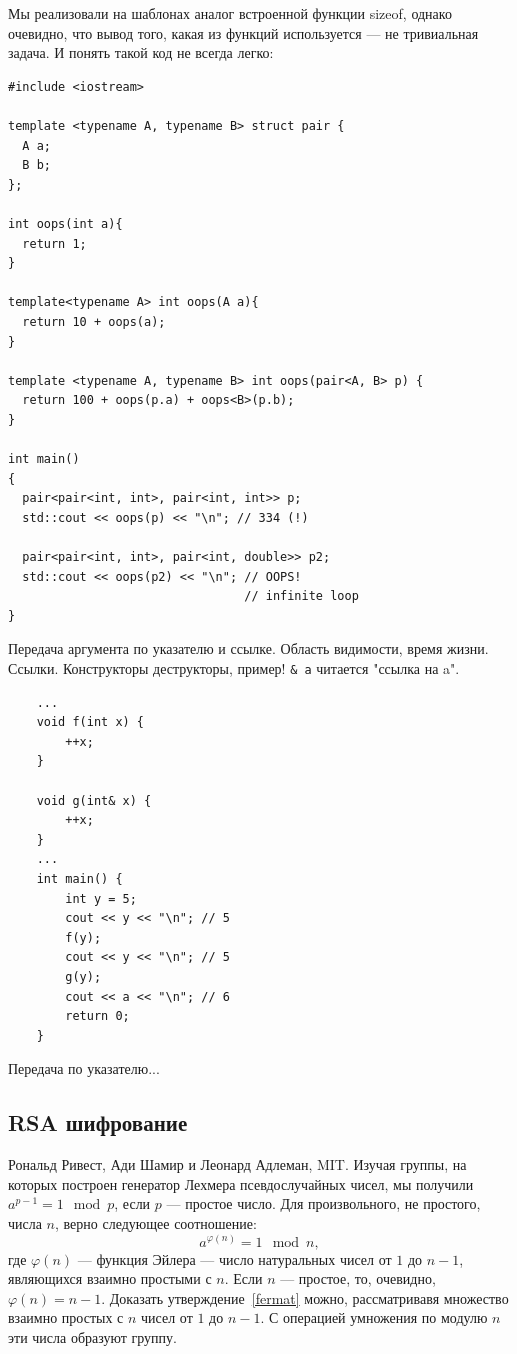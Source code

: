 \documentclass{book}
\begin{document}
Мы реализовали на шаблонах аналог встроенной функции sizeof, однако очевидно, что вывод того, какая
из функций используется --- не тривиальная задача. И понять такой код не всегда легко:
\begin{verbatim}
#include <iostream>

template <typename A, typename B> struct pair {
  A a;
  B b;
};

int oops(int a){
  return 1;
}

template<typename A> int oops(A a){
  return 10 + oops(a);
}

template <typename A, typename B> int oops(pair<A, B> p) {
  return 100 + oops(p.a) + oops<B>(p.b);
}

int main()
{
  pair<pair<int, int>, pair<int, int>> p;
  std::cout << oops(p) << "\n"; // 334 (!)

  pair<pair<int, int>, pair<int, double>> p2;
  std::cout << oops(p2) << "\n"; // OOPS!
                                 // infinite loop
}

\end{verbatim}

Передача аргумента по указателю и ссылке. Область видимости, время жизни.
Ссылки. Конструкторы деструкторы, пример! \texttt{& a} читается "ссылка на a".
\begin{verbatim}
    ...
    void f(int x) {
        ++x; 
    }

    void g(int& x) {
        ++x; 
    }
    ... 
    int main() {
        int y = 5; 
        cout << y << "\n"; // 5 
        f(y); 
        cout << y << "\n"; // 5 
        g(y); 
        cout << a << "\n"; // 6
        return 0;
    }
\end{verbatim}
Передача по указателю...

\subsection{RSA шифрование}

Рональд Ривест, Ади Шамир и Леонард Адлеман, MIT. Изучая группы, на которых построен генератор
Лехмера псевдослучайных чисел, мы получили $a^{p - 1} = 1 \mod p$, если $p$ --- простое число. Для
произвольного, не простого, числа $n$, верно следующее соотношение:
\begin{equation}
    \label{fermat}
    a^{\varphi(n)} = 1 \mod n,
\end{equation}
где $\varphi(n)$ --- функция Эйлера --- число натуральных чисел от $1$ до $n - 1$, являющихся
взаимно простыми с $n$. Если $n$ --- простое, то, очевидно, $\varphi(n) = n - 1$. Доказать
утверждение~\ref{fermat} можно, рассматривавя множество взаимно простых с $n$ чисел от $1$ до $n -
1$. С операцией умножения по модулю $n$ эти числа образуют группу.
\end{document}
